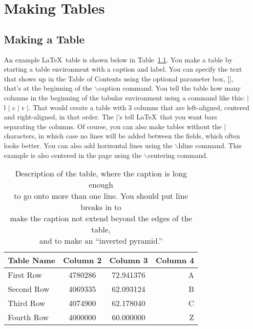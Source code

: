 \chapter{Making Tables}
\label{chp:chapter2}
\graphicspath{{figures/}{figures/chapter2/}}

\section{Making a Table}
An example \LaTeX\ table is shown below in Table~\ref{tab:comparison}.
You make a table by starting a table environment with a caption
and label.  You can specify the text that shows up in the Table of
Contents using the optional parameter box, [], that's at the
beginning of the $\backslash$caption command. You tell the table how
many columns in the beginning of the tabular environment using a
command like this: $|$ l $|$ c $|$ r $|$. That would create a table with 3 columns
that are left-aligned, centered and right-aligned, in that order. The $|$'s tell \LaTeX\ that
you want bars separating the columns. Of course, you can also make tables without the $|$ characters, in which case no lines will be added between the fields, which often looks better. You can also add horizontal
lines using the $\backslash$hline command. This example is also centered in the page using the
$\backslash$centering command.
%
\begin{table}[b]
\centering
\caption[Example table]{Description of the table, where the caption is long enough\\ to go onto more than one line. You should put line breaks in to\\ make the caption not extend beyond the edges of the table,\\ and to make an ``inverted pyramid.''}
\label{tab:comparison}
%
\begin{tabular}{|l|c|c|r|}
\hline

Table Name  & Column 2 & Column 3   & Column 4 \\
\hline
First Row   & 4780286  & 72.941376  & A \\
Second Row  & 4069335  & 62.093124  & B \\
Third Row   & 4074900  & 62.178040  & C \\
\hline
Fourth Row  & 4000000  & 60.000000  & Z \\
\hline

\end{tabular}
\end{table}
%

